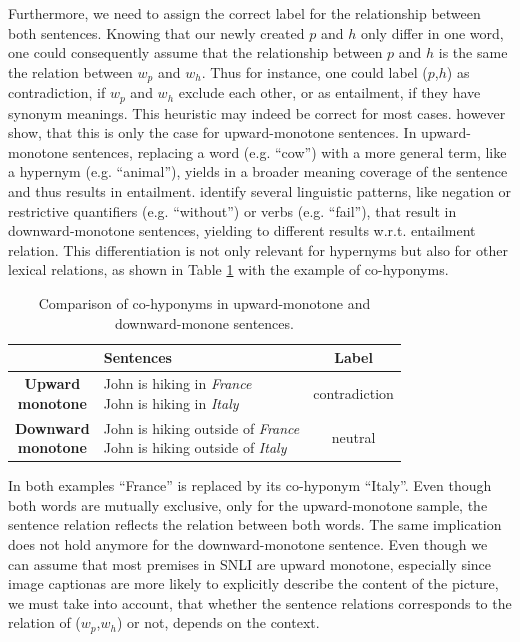 \noindent
Furthermore, we need to assign the correct label for the relationship between both sentences. Knowing that our newly created $p$ and $h$ only differ in one word, one could consequently assume that the relationship between $p$ and $h$ is the same the relation between $w_p$ and $w_h$. Thus for instance, one could label ($p$,$h$) as contradiction, if $w_p$ and $w_h$ exclude each other, or as entailment, if they have synonym meanings. This heuristic may indeed be correct for most cases. \cite{maccartney2007natural} however show, that this is only the case for upward-monotone sentences. In upward-monotone sentences, replacing a word (e.g. ``cow'') with a more general term, like a hypernym (e.g. ``animal''), yields in a broader meaning coverage of the sentence and thus results in entailment. \cite{maccartney2007natural} identify several linguistic patterns, like negation or restrictive quantifiers (e.g. ``without'') or verbs (e.g. ``fail''), that result in downward-monotone sentences, yielding to different results w.r.t. entailment relation. This differentiation is not only relevant for hypernyms but also for other lexical relations, as shown in Table \ref{tab:monoton_samples} with the example of co-hyponyms.
\begin{table}[htt]
\centering
\begin{tabular}{c|lc}
& \textbf{Sentences} & \textbf{Label} \\
\toprule
\specialcellc{\textbf{Upward}\\\textbf{monotone}} & \specialcell{John is hiking in \textit{France}\\John is hiking in \textit{Italy}} & contradiction \\
\midrule
\specialcellc{\textbf{Downward}\\\textbf{monotone}} & \specialcell{John is hiking outside of \textit{France}\\John is hiking outside of \textit{Italy}} & neutral \\
\bottomrule
\end{tabular}
 \caption{Comparison of co-hyponyms in upward-monotone and downward-monone sentences.}
 \label{tab:monoton_samples}

\end{table}
In both examples ``France'' is replaced by its co-hyponym ``Italy''. Even though both words are mutually exclusive, only for the upward-monotone sample, the sentence relation reflects the relation between both words. The same implication does not hold anymore for the downward-monotone sentence. Even though we can assume that most premises in \ac{SNLI} are upward monotone, especially since image captionas are more likely to explicitly describe the content of the picture, we must take into account, that whether the sentence relations corresponds to the relation of ($w_p$,$w_h$) or not, depends on the context.

